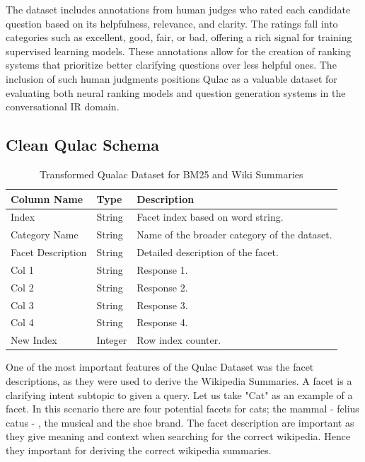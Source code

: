 \documentclass[11pt]{article}
\begin{document}
The dataset includes annotations from human judges who rated each candidate question based on its helpfulness, relevance, and clarity. The ratings fall into categories such as excellent, good, fair, or bad, offering a rich signal for training supervised learning models. These annotations allow for the creation of ranking systems that prioritize better clarifying questions over less helpful ones. The inclusion of such human judgments positions Qulac as a valuable dataset for evaluating both neural ranking models and question generation systems in the conversational IR domain.

\subsection{Clean Qulac Schema}
\renewcommand{\arraystretch}{1.2} %

\begin{table}[ht]
  \centering
  \caption{Transformed Qualac Dataset for BM25 and Wiki Summaries}
  \label{tab:dataset-columns}
  \begin{tabularx}{\columnwidth}{@{} l l X @{}}
    \textbf{Column Name}  & \textbf{Type}    & \textbf{Description}                        \\ 
    \hline
    Index                 & String           & Facet index based on word string.            \\ 
    Category Name         & String           & Name of the broader category of the dataset. \\ 
    Facet Description     & String           & Detailed description of the facet.           \\ 
    Col 1                 & String           & Response 1.                                  \\ 
    Col 2                 & String           & Response 2.                                  \\ 
    Col 3                 & String           & Response 3.                                  \\ 
    Col 4                 & String           & Response 4.                                  \\ 
    New Index             & Integer          & Row index counter.                           \\ 
  \end{tabularx}
\end{table}

One of the most important features of the Qulac Dataset was the facet descriptions, as they were used to derive the Wikipedia Summaries. A facet is a clarifying intent subtopic to given a query. Let us take "Cat" as an example of a facet. In this scenario there are four potential facets for cats; the mammal - felius catus - , the musical  and the shoe brand. The facet description are important as they give meaning and context when searching for the correct wikipedia. Hence they important for deriving the correct wikipedia summaries. 
\end{document}
